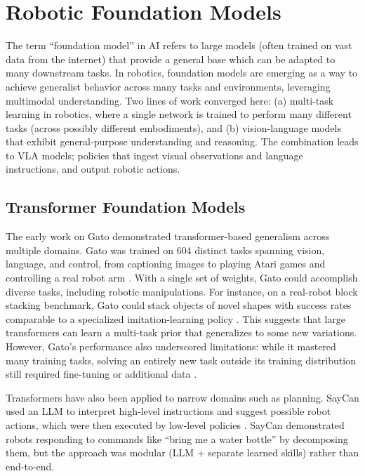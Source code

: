 \chapter{Robotic Foundation Models}
\label{sec:rfms}

The term ``foundation model'' in \ac{AI} refers to large models (often trained on vast data from the internet) that provide a general base which can be adapted to many downstream tasks. In robotics, foundation models are emerging as a way to achieve generalist behavior across many tasks and environments, leveraging multimodal understanding. Two lines of work converged here: (a) multi-task learning in robotics, where a single network is trained to perform many different tasks (across possibly different embodiments), and (b) vision-language models that exhibit general-purpose understanding and reasoning. The combination leads to \ac{VLA} models; policies that ingest visual observations and language instructions, and output robotic actions.

\section{Transformer Foundation Models}

The early work on Gato demonstrated transformer-based generalism across multiple domains. Gato was trained on 604 distinct tasks spanning vision, language, and control, from captioning images to playing Atari games and controlling a real robot arm \cite{GATO2022}. With a single set of weights, Gato could accomplish diverse tasks, including robotic manipulations. For instance, on a real-robot block stacking benchmark, Gato could stack objects of novel shapes with success rates comparable to a specialized imitation-learning policy \cite{GATO2022}. This suggests that large transformers can learn a multi-task prior that generalizes to some new variations. However, Gato’s performance also underscored limitations: while it mastered many training tasks, solving an entirely new task outside its training distribution still required fine-tuning or additional data \cite{GATO2022}.

Transformers have also been applied to narrow domains such as planning. SayCan used an \ac{LLM} to interpret high-level instructions and suggest possible robot actions, which were then executed by low-level policies \cite{SAYCAN2022}. SayCan demonstrated robots responding to commands like ``bring me a water bottle'' by decomposing them, but the approach was modular (LLM + separate learned skills) rather than end-to-end.

